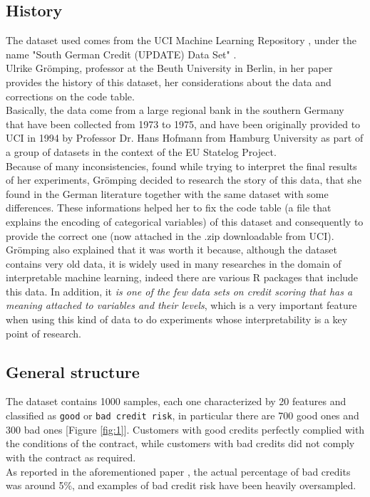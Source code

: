 \documentclass[letterpaper]{article}
\begin{document}
	\subsection{History}
	The dataset used comes from the UCI Machine Learning Repository \cite{uci}, under the name "South German Credit (UPDATE) Data Set" \cite{dataset}. \\
	Ulrike Grömping, professor at the Beuth University in Berlin, in her paper \cite{gromping} provides the history of this dataset, her considerations about the data and corrections on the code table.\\
	Basically, the data come from a large regional bank in the southern Germany that have been collected from 1973 to 1975, and have been originally provided to UCI in 1994 by Professor Dr. Hans Hofmann from Hamburg University \cite{hofmann} as part of a group of datasets in the context of the EU Statelog Project.\\
	Because of many inconsistencies, found while trying to interpret the final results of her experiments, Grömping decided to research the story of this data, that she found in the German literature together with the same dataset with some differences. These informations helped her to fix the code table (a file that explains the encoding of categorical variables) of this dataset and consequently to provide the correct one (now attached in the .zip downloadable from UCI). \\ 
	Grömping also explained that it was worth it because, although the dataset contains very old data, it is widely used in many researches in the domain of interpretable machine learning, indeed there are various R packages that include this data. In addition, it \emph{is one of the few data sets on credit scoring that has a meaning attached to variables and their levels}, which is a very important feature when using this kind of data to do experiments whose interpretability is a key point of research.  \\
	
	\subsection{General structure}
	The dataset contains 1000 samples, each one characterized by 20 features and classified as \texttt{good} or \texttt{bad credit risk}, in particular there are 700 good ones and 300 bad ones [Figure \ref{fig:1}].  Customers with good credits perfectly complied with the conditions of the contract, while customers with bad credits did not comply with the contract as required.\\ As reported in the aforementioned paper \cite{gromping}, the actual percentage of bad credits was around 5\%, and examples of bad credit risk have been heavily oversampled. 
	
\end{document}
